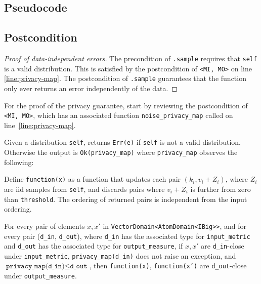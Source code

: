 \documentclass{article}
\begin{document}
\subsection*{Pseudocode}


\subsection*{Postcondition}
\begin{theorem}
\end{theorem}

\begin{proof}[Proof of data-independent errors]
    The precondition of \texttt{.sample} requires that \texttt{self} is a valid distribution.
    This is satisfied by the postcondition of \texttt{<MI, MO>} on line \ref{line:privacy-map}.
    The postcondition of \texttt{.sample} guarantees that the function only ever returns an error independently of the data.
\end{proof}

For the proof of the privacy guarantee, start by reviewing the postcondition of \texttt{<MI, MO>}, 
which has an associated function \texttt{noise\_privacy\_map} called on line~\ref{line:privacy-map}.
\begin{lemma}
    \label{lemma:new-privacy-map}
    Given a distribution \texttt{self},
    returns \texttt{Err(e)} if \texttt{self} is not a valid distribution.
    Otherwise the output is \texttt{Ok(privacy\_map)}
    where \texttt{privacy\_map} observes the following:

    Define \texttt{function(x)} as a function that updates each pair $(k_i, v_i + Z_i)$,
    where $Z_i$ are iid samples from \texttt{self},
    and discards pairs where $v_i + Z_i$ is further from zero than \texttt{threshold}.
    The ordering of returned pairs is independent from the input ordering.

    For every pair of elements $x, x'$ in \texttt{VectorDomain<AtomDomain<IBig>{}>},
    and for every pair (\texttt{d\_in}, \texttt{d\_out}),
    where \texttt{d\_in} has the associated type for \texttt{input\_metric} and \texttt{d\_out} has the associated type for \texttt{output\_measure},
    if $x, x'$ are \texttt{d\_in}-close under \texttt{input\_metric}, \texttt{privacy\_map(d\_in)} does not raise an exception,
    and $\texttt{privacy\_map(d\_in)} \leq \texttt{d\_out}$,
    then \texttt{function(x)}, \texttt{function(x')} are \texttt{d\_out}-close under \texttt{output\_measure}.
\end{lemma}
\end{document}
